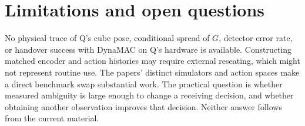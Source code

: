 \documentclass{article}
\begin{document}
\section{Limitations and open questions}

No physical trace of Q's cube pose, conditional spread of \(G\), detector error rate, or handover success with DynaMAC
on Q's hardware is available. Constructing matched encoder and action histories may require external reseating, which
might not represent routine use. The papers' distinct simulators and action spaces make a direct benchmark swap
substantial work. The practical question is whether measured ambiguity is large enough to change a receiving decision,
and whether obtaining another observation improves that decision. Neither answer follows from the current material.



\end{document}
